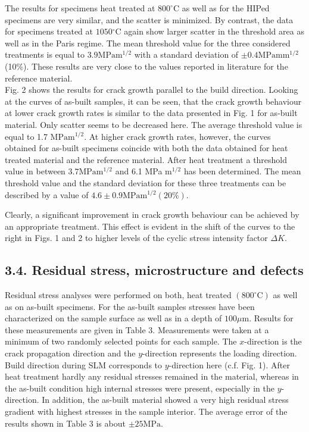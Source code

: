 \documentclass[10pt]{article}
\begin{document}
The results for specimens heat treated at $800^{\circ} \mathrm{C}$ as well as for the HIPed specimens are very similar, and the scatter is minimized. By contrast, the data for specimens treated at $1050{ }^{\circ} \mathrm{C}$ again show larger scatter in the threshold area as well as in the Paris regime. The mean threshold value for the three considered treatments is equal to $3.9 \mathrm{MPa} \mathrm{m}{ }^{1 / 2}$ with a standard deviation of $\pm 0.4 \mathrm{MPa} \mathrm{m} \mathrm{m}^{1 / 2}$ (10\%). These results are very close to the values reported in literature for the reference material.\\
Fig. 2 shows the results for crack growth parallel to the build direction. Looking at the curves of as-built samples, it can be seen, that the crack growth behaviour at lower crack growth rates is similar to the data presented in Fig. 1 for as-built material. Only scatter seems to be decreased here. The average threshold value is equal to 1.7 $\mathrm{MPa} \mathrm{m}{ }^{1 / 2}$. At higher crack growth rates, however, the curves obtained for as-built specimens coincide with both the data obtained for heat treated material and the reference material. After heat treatment a threshold value in between $3.7 \mathrm{MPa} \mathrm{m}^{1 / 2}$ and 6.1 MPa $\mathrm{m}^{1 / 2}$ has been determined. The mean threshold value and the standard deviation for these three treatments can be described by a value of $4.6 \pm 0.9 \mathrm{MPa} \mathrm{m}^{1 / 2}(20 \%)$.

Clearly, a significant improvement in crack growth behaviour can be achieved by an appropriate treatment. This effect is evident in the shift of the curves to the right in Figs. 1 and 2 to higher levels of the cyclic stress intensity factor $\Delta K$.

\subsection*{3.4. Residual stress, microstructure and defects}
Residual stress analyses were performed on both, heat treated $\left(800^{\circ} \mathrm{C}\right)$ as well as on as-built specimens. For the as-built samples stresses have been characterized on the sample surface as well as in a depth of $100 \mu \mathrm{m}$. Results for these measurements are given in Table 3. Measurements were taken at a minimum of two randomly selected points for each sample. The $x$-direction is the crack propagation direction and the $y$-direction represents the loading direction. Build direction during SLM corresponds to $y$-direction here (c.f. Fig. 1). After heat treatment hardly any residual stresses remained in the material, whereas in the as-built condition high internal stresses were present, especially in the $y$-direction. In addition, the as-built material showed a very high residual stress gradient with highest stresses in the sample interior. The average error of the results shown in Table 3 is about $\pm 25 \mathrm{MPa}$.
\end{document}
